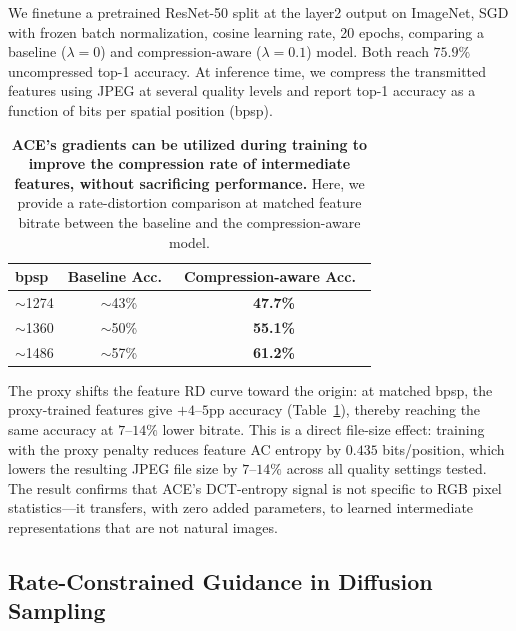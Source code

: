 We finetune a pretrained ResNet-50 split at the layer2 output on ImageNet, SGD with frozen batch normalization, cosine learning rate, 20 epochs, comparing a baseline ($\lambda=0$) and compression-aware ($\lambda=0.1$) model.
Both reach $75.9\%$ uncompressed top-1 accuracy.
At inference time, we compress the transmitted features using JPEG at several quality levels and report top-1 accuracy as a function of bits per spatial position (bpsp).

\begin{table}[h]
  \centering
  \small
  \caption{
  \textbf{ACE's gradients can be utilized during training to improve the compression rate of intermediate features, without sacrificing performance.}
  Here, we provide a rate-distortion comparison at matched feature bitrate between the baseline and the compression-aware model.
  }
  \label{tab:split}
  \begin{tabular}{lcc}
    \toprule
    bpsp & Baseline Acc.\ & Compression-aware Acc.\ \\
    \midrule
    $\sim$1274 & $\sim$43\% & \textbf{47.7\%} \\
    $\sim$1360 & $\sim$50\% & \textbf{55.1\%} \\
    $\sim$1486 & $\sim$57\% & \textbf{61.2\%} \\
    \bottomrule
  \end{tabular}
\end{table}

The proxy shifts the feature RD curve toward the origin: at matched bpsp, the proxy-trained features give $+4$--$5$pp accuracy (Table~\ref{tab:split}), thereby reaching the same accuracy at $7$--$14\%$ lower bitrate.
This is a direct file-size effect: training with the proxy penalty reduces feature AC entropy by $0.435$ bits/position, which lowers the resulting JPEG file size by $7$--$14\%$ across all quality settings tested.
The result confirms that ACE's DCT-entropy signal is not specific to RGB pixel statistics---it transfers, with zero added parameters, to learned intermediate representations that are not natural images.

\subsection{Rate-Constrained Guidance in Diffusion Sampling}
\label{sec:diffguide}

